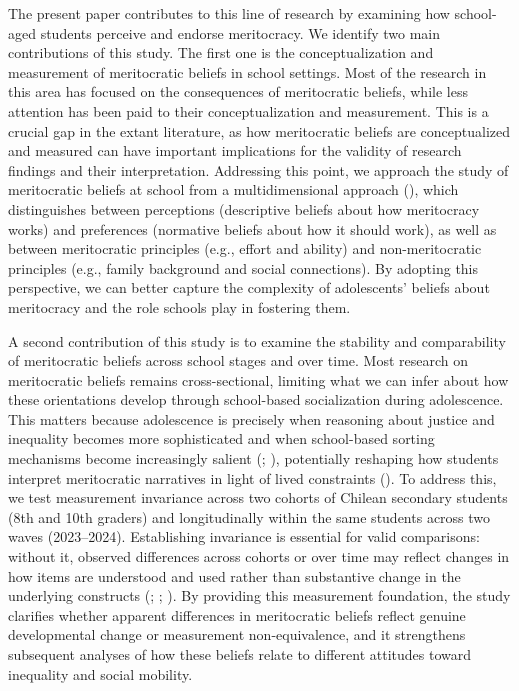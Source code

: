\documentclass[
  13pt,
]{article}
\begin{document}
The present paper contributes to this line of research by examining how
school-aged students perceive and endorse meritocracy. We identify two
main contributions of this study. The first one is the conceptualization
and measurement of meritocratic beliefs in school settings. Most of the
research in this area has focused on the consequences of meritocratic
beliefs, while less attention has been paid to their conceptualization
and measurement. This is a crucial gap in the extant literature, as how
meritocratic beliefs are conceptualized and measured can have important
implications for the validity of research findings and their
interpretation. Addressing this point, we approach the study of
meritocratic beliefs at school from a multidimensional approach
(),
which distinguishes between perceptions (descriptive beliefs about how
meritocracy works) and preferences (normative beliefs about how it
should work), as well as between meritocratic principles (e.g., effort
and ability) and non-meritocratic principles (e.g., family background
and social connections). By adopting this perspective, we can better
capture the complexity of adolescents' beliefs about meritocracy and the
role schools play in fostering them.

A second contribution of this study is to examine the stability and
comparability of meritocratic beliefs across school stages and over
time. Most research on meritocratic beliefs remains cross-sectional,
limiting what we can infer about how these orientations develop through
school-based socialization during adolescence. This matters because
adolescence is precisely when reasoning about justice and inequality
becomes more sophisticated and when school-based sorting mechanisms
become increasingly salient (; ),
potentially reshaping how students interpret meritocratic narratives in
light of lived constraints ().
To address this, we test measurement invariance across two cohorts of
Chilean secondary students (8th and 10th graders) and longitudinally
within the same students across two waves (2023--2024). Establishing
invariance is essential for valid comparisons: without it, observed
differences across cohorts or over time may reflect changes in how items
are understood and used rather than substantive change in the underlying
constructs (; ; ). By providing this measurement foundation, the
study clarifies whether apparent differences in meritocratic beliefs
reflect genuine developmental change or measurement non-equivalence, and
it strengthens subsequent analyses of how these beliefs relate to
different attitudes toward inequality and social mobility.
\end{document}
